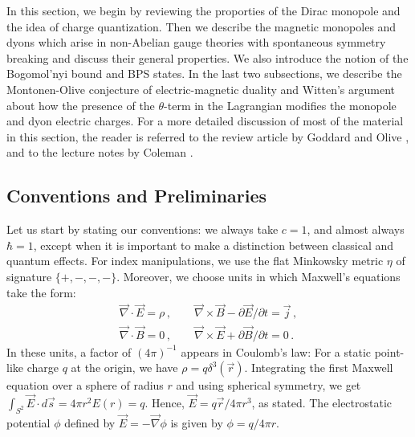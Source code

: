 In this section, we begin by reviewing the proporties of the Dirac
monopole and the idea of charge quantization. Then we describe the
magnetic monopoles and dyons which arise in non-Abelian gauge theories
with spontaneous symmetry breaking and discuss their general
properties. We also introduce the notion of the Bogomol'nyi bound and
BPS states. In the last two subsections, we describe the
Montonen-Olive conjecture of electric-magnetic duality and Witten's 
argument about how the presence of the $\theta$-term in the Lagrangian
modifies the monopole and dyon electric charges. For a more detailed
discussion of most of the material in this section, the reader is
referred to the review article by Goddard and Olive \cite{GO}, and to
the lecture notes by Coleman \cite{coleman1,coleman2}.

\subsection{Conventions and Preliminaries}

Let us start by stating our conventions: we always take $c=1$, and
almost always $\hbar=1$, except when it is important to make a
distinction between classical and quantum effects. For index
manipulations, we use the flat Minkowsky metric $\eta$ of signature
$\{ +,-,-,-\}$.  Moreover, we choose units in which Maxwell's
equations take the form:
\begin{equation}
\begin{array}{l}
\vec{\nabla}\cdot\vec{E}=\rho\,,\qquad\vec{\nabla}\times\vec{B}-
\partial \vec{E}/\partial t =\vec{j}\,,\\
\vec{\nabla}\cdot\vec{B}=0\,,\qquad \vec{\nabla}\times\vec{E} +
\partial\vec{B}/\partial t = 0\,.
\label{I}
\end{array}
\end{equation}
In these units, a factor of $(4 \pi)^{-1}$ appears in Coulomb's law:
For a static point-like charge $q$ at the origin, we have $\rho = q 
\delta^{3}(\vec{r})$. Integrating the first Maxwell equation over a
sphere of radius $r$ and using spherical symmetry, we get
$\int_{S^2} \vec{E} \cdot d \vec{s}=4\pi r^2 E(r)=q$. Hence,
$\vec{E}=q\vec{r}/4\pi r^{3}$, as stated. The electrostatic
potential $\phi$ defined by $\vec{E}=-\vec{\nabla}\phi$ is given by 
$\phi = q / 4 \pi r$. 


